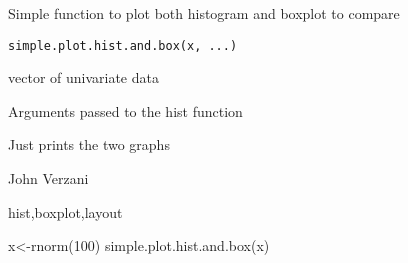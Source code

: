 \begin{Description}\relax
Simple function to plot both histogram and boxplot to compare
\end{Description}
\begin{Usage}
\begin{verbatim}
simple.plot.hist.and.box(x, ...)
\end{verbatim}
\end{Usage}
\begin{Arguments}
\begin{ldescription}
\item[\code{x}] vector of univariate data 
\item[\code{...}] Arguments passed to the hist function 
\end{ldescription}
\end{Arguments}
\begin{Value}
Just prints the two graphs
\end{Value}
\begin{Author}\relax
John Verzani
\end{Author}
\begin{SeeAlso}\relax
hist,boxplot,layout
\end{SeeAlso}
\begin{Examples}
\begin{ExampleCode}
x<-rnorm(100)
simple.plot.hist.and.box(x)
\end{ExampleCode}
\end{Examples}

